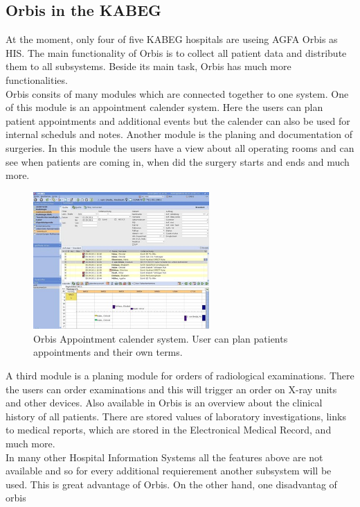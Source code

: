 \documentclass[a4paper]{article}
\begin{document}
	\subsection{Orbis in the KABEG}
	At the moment, only four of five KABEG hospitals are useing AGFA Orbis as HIS.
	The main functionality of Orbis is to collect all patient data and distribute
	them to all subsystems. Beside its main task, Orbis has much more
	functionalities.\\
	Orbis consits of many modules which are connected together to one system. One
	of this module is an appointment calender system. Here the users can plan
	patient appointments and additional events but the calender can also be used
	for internal scheduls and notes.
	Another module is the planing and documentation of surgeries. In this module
	the users have a view about all operating rooms and can see when patients
	are coming in, when did the surgery starts and ends and much more.\\
	\begin{figure}[!ht]
		  \centering
		      \includegraphics[width=0.6\textwidth]{orbis1}
		  \caption{Orbis Appointment calender system. User can plan 
		  patients appointments and their own terms.}
	\end{figure}
	A third module is a planing module for orders of radiological
	examinations. There the users can order examinations and this will trigger an
	order on X-ray units and other devices. Also available in Orbis is an 
	overview about the clinical history of all patients. There are
	stored values of laboratory investigations, links to medical reports, which are
	stored in the Electronical Medical Record, and much more.\\
	In many other Hospital Information Systems all the features above are not
	available and so for every additional requierement another subsystem will be
	used.
	This is great advantage of Orbis. On the other hand, one disadvantag of orbis
\end{document}
